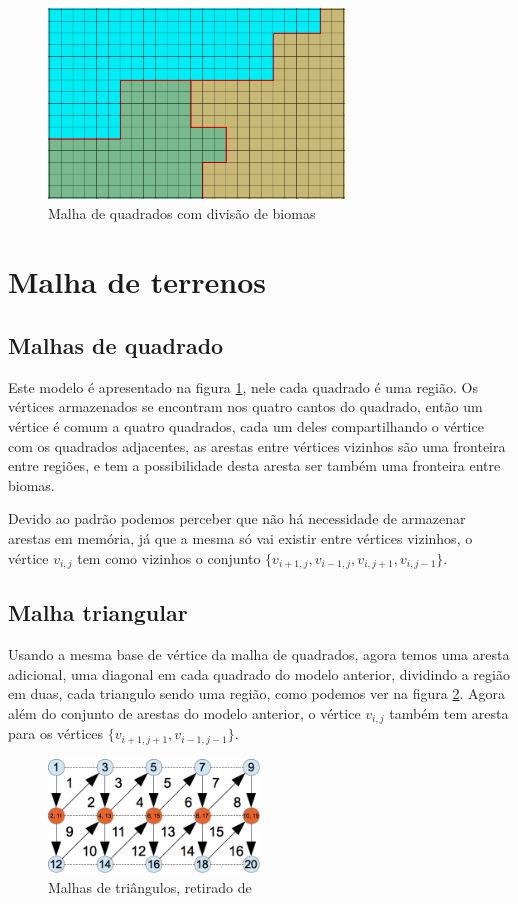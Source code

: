 \begin{figure}[H]
    \centering
    \includegraphics[width=0.7\textwidth]{figuras/squadStripBiomes.png}
    \caption{Malha de quadrados com divisão de biomas}
    \label{fig:squadStripBiomes}
\end{figure}
\section{Malha de terrenos}
\subsection{Malhas de quadrado}
Este modelo é apresentado na figura \ref{fig:squadStripBiomes}, nele cada
quadrado é uma região. Os vértices armazenados se encontram nos quatro cantos
do quadrado, então um vértice é comum a quatro quadrados, cada um deles
compartilhando o vértice com os quadrados adjacentes, as arestas entre vértices
vizinhos são uma fronteira entre regiões, e tem a possibilidade desta aresta ser
também uma fronteira entre biomas.

Devido ao padrão podemos perceber que não há necessidade de armazenar arestas
em memória, já que a mesma só vai existir entre vértices vizinhos, o vértice
$v_{i, j}$ tem como vizinhos o conjunto $\{v_{i+1, j}, v_{i-1, j}, v_{i, j+1}, v_{i, j-1}\}$.
\subsection{Malha triangular}
Usando a mesma base de vértice da malha de quadrados, agora temos uma aresta
adicional, uma diagonal em cada quadrado do modelo anterior, dividindo a região
em duas, cada triangulo sendo uma região, como podemos ver na figura \ref{fig:vbo}.
Agora além do conjunto de arestas do modelo anterior, o vértice $v_{i, j}$ também tem
aresta para os vértices $\{v_{i+1, j+1}, v_{i-1, j-1}\}$.

\begin{figure}[H]
    \centering
    \includegraphics[width=0.5\textwidth]{figuras/vbo.png}
    \caption{Malhas de triângulos, retirado de \cite{androidtrianglestrip}}
    \label{fig:vbo}
\end{figure}

